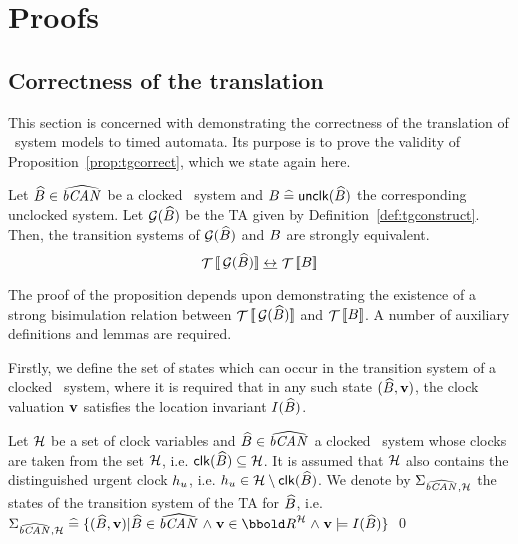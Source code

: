 \chapter{Proofs}\label{app:proofs}
\section{Correctness of the translation}
This section is concerned with demonstrating the correctness of the 
translation of \bcandle\ system models to timed automata. Its
purpose is to prove the validity of Proposition~\ref{prop:tgcorrect},
which we state again here.
\begin{proposition}\label{prop:pftgcorrect}
Let ${\widehat{{B}}} \in {\widehat{{\text{\it bCAN\/}_{}}}}$ be a clocked \bcandle\ system and
${B} \mathrel{\widehat=} {\mathop{{\sf unclk}}}({\widehat{{B}}})$ the corresponding unclocked system.
Let $\Gr(\csys)$ be the TA given by 
Definition~\ref{def:tgconstruct}. Then, the transition systems
of $\Gr(\csys)$ and ${B}$ are strongly equivalent.
\[
\TSys{\Gr(\csys)} \bisim \TSys{\sys}
\]
\end{proposition}

The proof of the proposition depends upon demonstrating the existence of
a strong bisimulation relation between $\TSys{\Gr(\csys)}$ and $\TSys{\sys}$. 
A number of auxiliary definitions and lemmas are required.

Firstly, we define the set of states which can occur in the
transition system of a clocked \bcandle\ system, where it is required
that in any such state $({\widehat{{B}}},\mathbf{v})$, the clock valuation $\mathbf{v}$ satisfies
the location invariant $I({\widehat{{B}}})$.
\begin{definition}
Let $\clocks$ be a set of clock variables and
${\widehat{{B}}} \in {\widehat{{\text{\it bCAN\/}_{}}}}$ a clocked \bcandle\ system whose clocks are taken from
the set $\clocks$, i.e. $\clk(\csys) \subseteq \clocks$. It is assumed that
$\clocks$ also contains the distinguished urgent clock $h_{u}$,
i.e. $\uclock \in \clocks \setminus \clk(\csys)$. We denote
by $\States_{\CSys{},\clocks}$ the states of the transition system of the
TA for ${\widehat{{B}}}$, i.e. \\
\hspace*{2cm} $\States_{\CSys{},\clocks} \defs 
  \{(\csys,\clkvl) | \csys \in \CSys{} \land \clkvl \in \clkvls \land
                     \clkvl \models \tginv(\csys)\}$
\qed
\end{definition}

